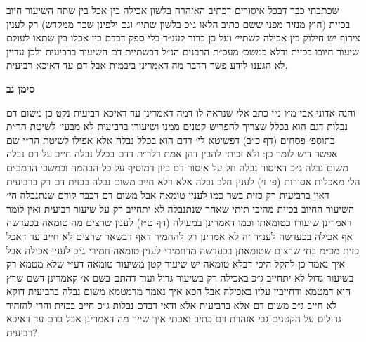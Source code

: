 \documentclass[12pt, openany]{book}
\newcommand{\chapname}{}
\newcommand{\newchap}[1]{
	\addcontentsline{toc}{chapter}{#1}
	\renewcommand{\chapname}{#1}
		\begin{center}
			\textbf{%
\fontsize{16pt}{16pt}\selectfont
				#1}
		\end{center}
}
\begin{document}
\begin{multicols}{2}
שכתבתי כבר דבכל איסורים דכתיב האזהרה בלשון אכילה בין אכל בין שתה השיעור חיוב בכזית (חוץ מנזיר מפני ששם כתיב הלאו ג״כ בלשון שתיי׳ וגם ילפינן שכר ממקדש) רק לענין צירוף יש חילוק בין אכילה לשתיי׳ ועל כן ברור לענ״ד בלי ספק דבדם בין אכלו בין שתאו לעולם שיעור חיובו בכזית ודלא כמשכ׳ מעכ״ת הרבנים הנ״ל דבשתיית דם השיעור ברביעית ולכן עדיין לא הגענו לידע פשר הדבר מה דאמרינן ביבמות אבל דם עד דאיכא רביעית.\\\vspace{0pt}

\end{multicols}\newpage

\newchap{סימן נב}
\begin{multicols}{2}
והנה אדוני אבי מ״ו נ״י כתב אלי שנראה לו דמה דאמרינן עד דאיכא רביעית נקט כן משום דם נבלות דגם הוא בכלל שצריך להפריש קטנים ממנו ושיעורו ברביעית לא מבעי׳ לשיטת הר״ת בתוספ׳ פסחים (דף כ״ב) דפשיטא לי׳ דדם הוא בכלל נבלה אלא אפילו לשיטת הר״י שם אפשר דיש לומר כן: ולא זכיתי להבין דהן אמת דלר״ת דדם בכלל נבלה חייב על דם נבלה משום נבלה ג״כ דאיסור נבלה חל על איסור דם כיון דמוסיף על כל הבהמה וכמשכ׳ הרמב״ם הל׳ מאכלות אסורות (פ׳ ז׳) לענין חלב נבלה אלא דלא חייב משום נבלה בכזית דם רק ברביעית דאין ברביעית רק כזית בשר כמו לענין טומאה אבל משום דם דכבר קודם שנתנבלה הי׳ השיעור החיוב בכזית מהיכי תיתי שאחר שנתנבלה לא יתחייב רק על שיעור רביעית ואין לומר דאמרינן שיעורו כטומאתו וכמו דאמרינן במעילה (דף ט״ז) לענין שרצים מה טומאה בכעדשה אף אכילה בכעדשה לענ״ד זה לא אמרינן רק להחמיר דאף דבשאר שרצים לא חייב עד דאכל כזית מכ״מ בח׳ שרצים שטומאתן בכעדשה מדחמירי לענין טומאה חמירי ג״כ לענין אכילה אבל איך נאמר כן להקל היכי דבלא טומאה יש שיעור קטן משיעור טומאה דע״י שלא מטמא רק בשיעור גדול לא יתחייב ג״כ באכילה רק בשיעור גדול ועוד דהתם בשם א׳ קאמרינן דשם שרץ הוא דמטמא ודחייבין עליו באכילה אבל הכא איך נאמר מדמטמא משום נבלה ברביעית דוקא לא חייב ג״כ משום דם אלא ברביעית אלא ודאי דבדם נבלות ג״כ חייב בכזית והרי להזהיר גדולים על הקטנים גבי אזהרת דם כתיב ואכתי איך שייך מה דאמרינן אבל בדם עד דאיכא רביעית?\\\vspace{0pt}


\end{multicols}
\end{document}
